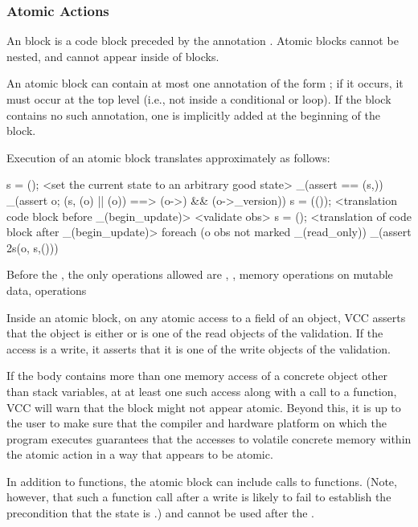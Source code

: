 \documentclass[preprint,nocopyrightspace]{sigplanconf}
\begin{document}
{{{{\begin{VCC}
\subsubsection{Atomic Actions}

An  block is a code block preceded by the
annotation . Atomic blocks cannot be nested, and
cannot appear inside of  blocks. 

An atomic block can contain at most one annotation of the
form ; if it occurs, it must occur at the top
level (i.e., not inside a conditional or loop). If the block contains
no such annotation, one is implicitly added at the beginning of the
block. 

Execution of an atomic block translates approximately as follows:
\begin{VCC}
\state s = \now();
<set the current state to an arbitrary good state>
_(assert \me == \at(s,\me))
_(assert \forall \object o; \at(s, \wrapped(o) || \mutable(o))
    ==> \unchanged(o->\version) && \unchanged(o->\volatile_version))
s = \stutter(\now());
<translation code block before _(begin_update)>
<validate obs>
s = \now();
<translation of code block after _(begin_update)>
foreach (\object o \in obs not marked _(read_only))
  _(assert \inv2s(o, s,\now()))
\end{VCC}

Before the , the only operations allowed
are , , memory operations on mutable data,
 operations 

Inside an atomic block, on any atomic access to a field of an object,
VCC asserts that the object is either \vcc{\mutable} or is one of the
read objects of the validation. If the access is a write, it asserts
that it is one of the write objects of the validation.

If the body contains more than one memory access of a concrete object
other than stack variables, at at least one such access along with a
call to a  function, VCC will warn that the block might
not appear atomic. Beyond this, it is up to the user to make sure that the
compiler and hardware platform on which the program executes guarantees that 
the accesses to volatile concrete memory within the
atomic action in a way that appears to be atomic. 

In addition to  functions, the atomic block can
include calls to  functions. (Note, however, that such a
function call after a write is likely to fail to establish the
precondition that the state is .) 
and  cannot be used after the .


\end{VCC}}}}}
\end{document}
